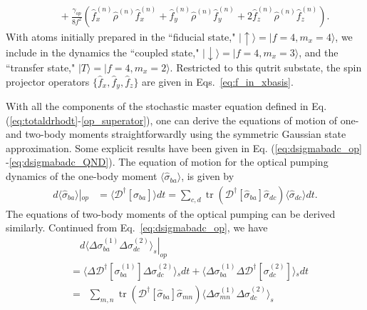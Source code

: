 \documentclass[aps,pra,twocolumn,superscriptaddress]{revtex4-1} %
\DeclareMathOperator{\tr}{tr}
\def\ket#1{\lvert{#1}\rangle}%
\newcommand{\nn}{\nonumber}
\newcommand{\expect}[1]{\big\langle #1 \big\rangle}
\begin{document}
\begin{appendix}
\begin{align}
&\quad +\!\frac{\gamma_{op}}{8 f^2}\! \left(\!\hat{f}^{(n)}_x  \!\hat{\rho}^{(n)}\! \hat{f}^{(n)}_x\!\!+\!\!\hat{f}^{(n)}_y  \!\hat{\rho}^{(n)}\!  \hat{f}^{(n)}_y \!\!+\!\!2 \hat{f}^{(n)}_z\!  \hat{\rho}^{(n)}\!  \hat{f}^{(n)}_z\!\right).\label{eq:op_master2}
\end{align}
With  atoms initially prepared in the  ``fiducial state," $\ket{\uparrow} = \ket{f=4,m_x=4}$, we include  in the dynamics the ``coupled state,"  $\ket{\downarrow} = \ket{f=4,m_x=3}$, and the ``transfer state," $\ket{T} = \ket{f=4,m_x=2}$.  Restricted to this qutrit substate, the spin projector operators $\{ \hat{f}_x,  \hat{f}_y, \hat{f}_z \}$ are given in Eqs.~\eqref{eq:f_in_xbasis}.

With all the components of the stochastic master equation defined in Eq. (\ref{eq:totaldrhodt}-\ref{op_superator}), one can derive the equations of motion of one- and two-body moments straightforwardly using the symmetric Gaussian state approximation. Some explicit results have been given in Eq. (\ref{eq:dsigmabadc_op} -\ref{eq:dsigmabadc_QND}). The equation of motion for the optical pumping dynamics of the one-body moment $ \expect{\hat{\sigma}_{ba}} $, is given by
\begin{align}
\left.d\expect{\!\hat{\sigma}_{ba}\!}\right|\!_{op}\!&=\! \expect{\!\mathcal{D}^\dagger\!\left[\hat{\sigma}_{ba} \right]\!}dt\!=\!\!\!\sum_{c,d}\!\!\tr(\mathcal{D}^\dagger\!\left[\hat{\sigma}_{ba}\right]\!\hat{\sigma}_{dc} )\expect{\!\hat{\sigma}_{dc}\!}dt.\label{eq:dsigmaba_op_expand}
\end{align}
The equations of two-body moments of the optical pumping can be derived similarly. Continued from Eq.~\eqref{eq:dsigmabadc_op}, we have 
\begin{align}
&\quad\left.d\expect{\!\Delta \sigma_{ba}^{(\!1\!)}\Delta\sigma_{dc}^{(\!2\!)} }_s\right|_{op}\nn\\ 
&= \expect{\!\Delta\mathcal{D}^\dagger[ \sigma_{ba}^{(\!1\!)}]\Delta\sigma_{dc}^{(\!2\!)} }\!_sdt \!+\! \expect{\!\Delta \sigma_{ba}^{(\!1\!)} \Delta\mathcal{D}^\dagger[\sigma_{dc}^{(\!2\!)}] }\!_sdt\nn \\
&=\,\,\,\sum_{m,n}\! \tr\!\left(\mathcal{D}^\dagger[\hat{\sigma}_{ba} ]\hat{\sigma}_{mn}\! \right)\!\expect{\!\Delta\sigma_{mn}^{(\!1\!)}\Delta\sigma_{dc}^{(\!2\!)} }_s \nn\\

\end{align}
\end{appendix}
\end{document}
